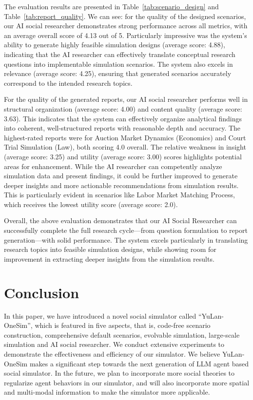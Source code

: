 \documentclass{article}
\theoremstyle{definition}
\theoremstyle{theorem}
\theoremstyle{proof}
\theoremstyle{remark}
\begin{document}
    The evaluation results are presented in Table~\ref{tab:scenario_design} and Table~\ref{tab:report_quality}.
    We can see: 
    for the quality of the designed scenarios, our AI social researcher demonstrates strong performance across all metrics, with an average overall score of 4.13 out of 5. Particularly impressive was the system's ability to generate highly feasible simulation designs (average score: 4.88), indicating that the AI researcher can effectively translate conceptual research questions into implementable simulation scenarios. The system also excels in relevance (average score: 4.25), ensuring that generated scenarios accurately correspond to the intended research topics.
    
    For the quality of the generated reports, our AI social researcher performs well in structural organization (average score: 4.00) and content quality (average score: 3.63). This indicates that the system can effectively organize analytical findings into coherent, well-structured reports with reasonable depth and accuracy. The highest-rated reports were for Auction Market Dynamics (Economics) and Court Trial Simulation (Law), both scoring 4.0 overall. The relative weakness in insight (average score: 3.25) and utility (average score: 3.00) scores highlights potential areas for enhancement. While the AI researcher can competently analyze simulation data and present findings, it could be further improved to generate deeper insights and more actionable recommendations from simulation results. This is particularly evident in scenarios like Labor Market Matching Process, which receives the lowest utility score (average score: 2.0).

    Overall, the above evaluation demonstrates that our AI Social Researcher can successfully complete the full research cycle—from question formulation to report generation—with solid performance. The system excels particularly in translating research topics into feasible simulation designs, while showing room for improvement in extracting deeper insights from the simulation results. 


    \section{Conclusion}\label{sec6}
    In this paper, we have introduced a novel social simulator called ``YuLan-OneSim'', which is featured in five aspects, that is, code-free scenario construction, comprehensive default scenarios, evolvable simulation, large-scale simulation and AI social researcher.
    We conduct extensive experiments to demonstrate the effectiveness and efficiency of our simulator. 
    We believe YuLan-OneSim makes a significant step towards the next generation of LLM agent based social simulator.
    In the future, we plan to incorporate more social theories to regularize agent behaviors in our simulator, and will also incorporate more spatial and multi-modal information to make the simulator more applicable.
    
\end{document}
